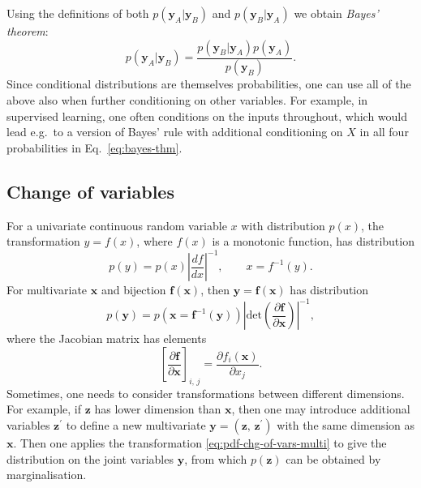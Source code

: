 Using the definitions of both $p(\mathbf{y}_A|\mathbf{y}_B)$ and $p(\mathbf{y}_B|\mathbf{y}_A)$ we obtain \emph{Bayes' theorem}:
\begin{equation}
\label{eq:bayes-thm}
	p(\mathbf{y}_A|\mathbf{y}_B) = \frac{p(\mathbf{y}_B|\mathbf{y}_A)p(\mathbf{y}_A)}{p(\mathbf{y}_B)}.
\end{equation}
Since conditional distributions are themselves probabilities, one can use all of the above also when further conditioning on other variables. For example, in supervised learning, one often conditions on the inputs throughout, which would lead e.g.\ to a version of Bayes' rule with additional conditioning on $X$ in all four probabilities in Eq.~\eqref{eq:bayes-thm}.


\subsection{Change of variables}

For a univariate continuous random variable $x$ with distribution $p(x)$, the transformation $y = f(x)$, where $f(x)$ is a monotonic function, has distribution
\begin{equation}
\label{eq:pdf-chg-of-vars}
	p(y) = p(x)\left|\frac{df}{dx}\right|^{-1},
	\qquad x = f^{-1}(y).
\end{equation}
For multivariate $\mathbf{x}$ and bijection $\mathbf{f}(\mathbf{x})$, then $\mathbf{y} = \mathbf{f}(\mathbf{x})$ has distribution
\begin{equation}
\label{eq:pdf-chg-of-vars-multi}
	p(\mathbf{y}) = p(\mathbf{x} = \mathbf{f}^{-1}(\mathbf{y}))\left|\mathrm{det}\left(\frac{\partial \mathbf{f}}{\partial \mathbf{x}}\right)\right|^{-1},
\end{equation}
where the Jacobian matrix has elements
\begin{equation}
	\left[\frac{\partial \mathbf{f}}{\partial \mathbf{x}}\right]_{i,\, j}
	= \frac{\partial f_{i}(\mathbf{x})}{\partial x_j}.
\end{equation}
Sometimes, one needs to consider transformations between different dimensions. For example, if $\mathbf{z}$ has lower dimension than $\mathbf{x}$, then one may introduce additional variables $\mathbf{z}^\prime$ to define a new multivariate $\mathbf{y} = (\mathbf{z},\, \mathbf{z}^\prime)$ with the same dimension as $\mathbf{x}$. Then one applies the transformation \eqref{eq:pdf-chg-of-vars-multi} to give the distribution on the joint variables $\mathbf{y}$, from which $p(\mathbf{z})$ can be obtained by marginalisation.


